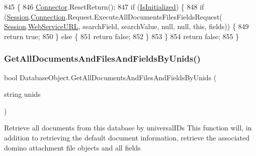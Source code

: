 \begin{DoxyCode}
845                                                                                                            
        \{
846         \mbox{\hyperlink{class_connector}{Connector}}.ResetReturn();
847         \textcolor{keywordflow}{if} (\mbox{\hyperlink{class_database_object_a5fe036d32a30eb10d1b3f6a30263f740}{IsInitialized}}) \{
848             \textcolor{keywordflow}{if} (\mbox{\hyperlink{class_database_object_aa8484162b7d2a7c4c9426bca13c64c07}{Session}}.\mbox{\hyperlink{class_session_object_a014bdbf705a753540e19bfb53030c55c}{Connection}}.Request.ExecuteAllDocumentsFilesFieldsRequest(
      \mbox{\hyperlink{class_database_object_aa8484162b7d2a7c4c9426bca13c64c07}{Session}}.\mbox{\hyperlink{class_session_object_a697c071c812fbf7ad1166b896fb44c16}{WebServiceURL}}, searchField, searchValue, null, null, \textcolor{keyword}{this}, fields)) \{
849                 \textcolor{keywordflow}{return} \textcolor{keyword}{true};
850             \} \textcolor{keywordflow}{else} \{
851                 \textcolor{keywordflow}{return} \textcolor{keyword}{false};
852             \}
853         \}
854         \textcolor{keywordflow}{return} \textcolor{keyword}{false};
855     \}
\end{DoxyCode}
\mbox{\label{class_database_object_a92de6fceafa29d3dcc8d3fff6961e6d6}} 
\subsubsection{\texorpdfstring{Get\+All\+Documents\+And\+Files\+And\+Fields\+By\+Unids()}{GetAllDocumentsAndFilesAndFieldsByUnids()}\hspace{0.1cm}{\footnotesize\ttfamily [1/4]}}
{\footnotesize\ttfamily bool Database\+Object.\+Get\+All\+Documents\+And\+Files\+And\+Fields\+By\+Unids (\begin{DoxyParamCaption}\item[{string}]{unids }\end{DoxyParamCaption})}



Retrieve all documents from this database by universal\+I\+Ds This function will, in addition to retrieving the default document information, retrieve the associated domino attachment file objects and all fields 

